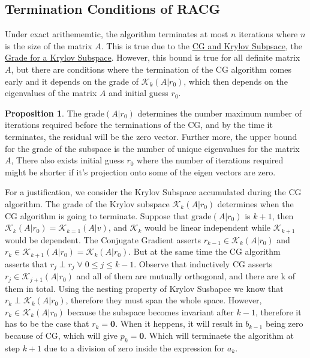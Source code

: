 \documentclass[]{article}
\theoremstyle{definition}
\newtheorem{prop}{Proposition}[section]  %
\begin{document}
    \subsection{Termination Conditions of RACG}
        Under exact arithememtic, the algorithm terminates at most $n$ iterations where $n$ is the size of the matrix $A$. This is true due to the \hyperref[theorem:CG_and_Krylov_Subspace]{CG and Krylov Subpsace}, the \hyperref[theorem:Existence_of_Grade_for_a_Krylov_Subspace]{Grade for a Krylov Subspace}. However, this bound is true for all definite matrix $A$, but there are conditions where the termination of the CG algorithm comes early and it depends on the grade of $\mathcal K_k(A|r_0)$, which then depends on the eigenvalues of the matrix $A$ and initial guess $r_0$. 
        \begin{prop}
            The $\text{grade}(A|r_0)$ determines the number maximum number of iterations required before the terminations of the CG, and by the time it terminates, the residual will be the zero vector. Further more, the upper bound for the grade of the subspace is the number of unique eigenvalues for the matrix $A$, There also exists initial guess $r_0$ where the number of iterations required might be shorter if it's projection onto some of the eigen vectors are zero. 
        \end{prop}
        For a justification, we consider the Krylov Subspace accumulated during the CG algorithm. The grade of the Krylov subspace $\mathcal K_k(A|r_0)$ determines when the CG algorithm is going to terminate. Suppose that $\text{grade}(A|r_0)$ is $k + 1$, then $\mathcal K_{k}(A|r_0) = \mathcal K_{k = 1}(A|v)$, and $\mathcal K_k$ would be linear independent while $\mathcal K_{k+1}$ would be dependent. The Conjugate Gradient asserts $r_{k - 1}\in \mathcal K_k(A|r_0)$ and $r_k \in \mathcal K_{k + 1}(A|r_0) = \mathcal K_k(A|r_0)$. But at the same time the CG algorithm asserts that $r_j \perp r_j \;\forall\; 0 \le j \le k - 1$. Observe that inductively CG asserts $r_j \in \mathcal K_{j + 1}(A|r_0)$ and all of them are mutually orthogonal, and there are k of them in total. Using the nesting property of Krylov Susbapce we know that $r_k\perp \mathcal K_k(A|r_0)$, therefore they must span the whole space. However, $r_k\in \mathcal K_k(A|r_0)$ because the subspace becomes invariant after $k - 1$, therefore it has to be the case that $r_k = \mathbf 0$. When it heppens, it will result in $b_{k - 1}$ being zero because of CG, which will give $p_k = \mathbf 0$. Which will terminaete the algorithm at step $k + 1$ due to a division of zero inside the expression for $a_k$. 
\end{document}
